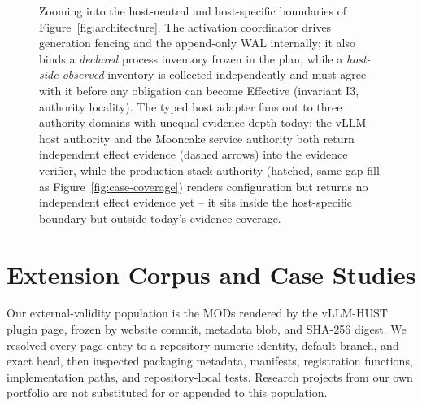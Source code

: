 \documentclass[letterpaper,twocolumn,10pt]{article}
\begin{document}
\begin{figure}[t]
{
}
\caption{Zooming into the host-neutral and host-specific boundaries of
Figure~\ref{fig:architecture}.  The activation coordinator drives generation
fencing and the append-only WAL internally; it also binds a \emph{declared}
process inventory frozen in the plan, while a \emph{host-side observed}
inventory is collected independently and must agree with it before any
obligation can become Effective (invariant I3, authority locality).  The
typed host adapter fans out to three authority domains with unequal evidence
depth today: the vLLM host authority and the Mooncake service authority both
return independent effect evidence (dashed arrows) into the evidence
verifier, while the production-stack authority (hatched, same gap fill as
Figure~\ref{fig:case-coverage}) renders configuration but returns no
independent effect evidence yet -- it sits inside the host-specific boundary
but outside today's evidence coverage.}
\label{fig:coordinator-detail}
\end{figure}

\section{Extension Corpus and Case Studies}
Our external-validity population is the \ECPAWorkshopMods{} MODs rendered by the
vLLM-HUST plugin page, frozen by website commit, metadata blob, and SHA-256
digest.  We resolved every page entry to a repository numeric identity,
default branch, and exact head, then inspected packaging metadata, manifests,
registration functions, implementation paths, and repository-local tests.
Research projects from our own portfolio are not substituted for or appended
to this population.
\end{document}

